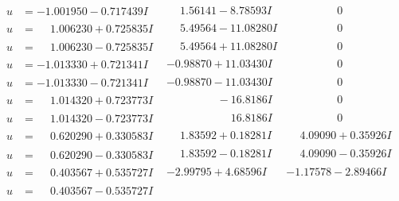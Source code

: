 \documentclass[1p]{elsarticle_modified}
\theoremstyle{definition}
\begin{document}
$$\begin{array}{c|c|c}
\begin{aligned}
u &= -1.001950 - 0.717439 I\end{aligned}
 & \phantom{-}1.56141 - 8.78593 I & \phantom{-0.000000 } 0 \\ \hline\begin{aligned}
u &= \phantom{-}1.006230 + 0.725835 I\end{aligned}
 & \phantom{-}5.49564 - 11.08280 I & \phantom{-0.000000 } 0 \\ \hline\begin{aligned}
u &= \phantom{-}1.006230 - 0.725835 I\end{aligned}
 & \phantom{-}5.49564 + 11.08280 I & \phantom{-0.000000 } 0 \\ \hline\begin{aligned}
u &= -1.013330 + 0.721341 I\end{aligned}
 & -0.98870 + 11.03430 I & \phantom{-0.000000 } 0 \\ \hline\begin{aligned}
u &= -1.013330 - 0.721341 I\end{aligned}
 & -0.98870 - 11.03430 I & \phantom{-0.000000 } 0 \\ \hline\begin{aligned}
u &= \phantom{-}1.014320 + 0.723773 I\end{aligned}
 & \phantom{-0.000000 } -16.8186 I & \phantom{-0.000000 } 0 \\ \hline\begin{aligned}
u &= \phantom{-}1.014320 - 0.723773 I\end{aligned}
 & \phantom{-0.000000 -}16.8186 I & \phantom{-0.000000 } 0 \\ \hline\begin{aligned}
u &= \phantom{-}0.620290 + 0.330583 I\end{aligned}
 & \phantom{-}1.83592 + 0.18281 I & \phantom{-}4.09090 + 0.35926 I \\ \hline\begin{aligned}
u &= \phantom{-}0.620290 - 0.330583 I\end{aligned}
 & \phantom{-}1.83592 - 0.18281 I & \phantom{-}4.09090 - 0.35926 I \\ \hline\begin{aligned}
u &= \phantom{-}0.403567 + 0.535727 I\end{aligned}
 & -2.99795 + 4.68596 I & -1.17578 - 2.89466 I \\ \hline\begin{aligned}
u &= \phantom{-}0.403567 - 0.535727 I\end{aligned}

\end{array}$$
\end{document}
